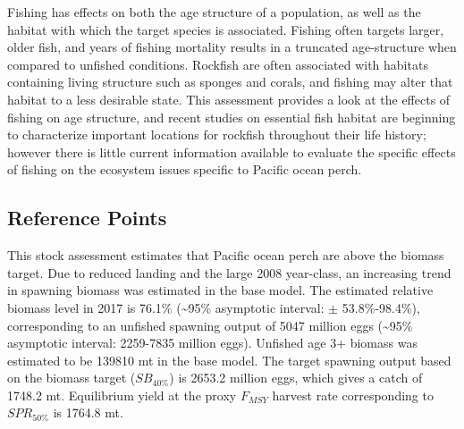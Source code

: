 \documentclass[12pt,]{article}
\begin{document}
Fishing has effects on both the age structure of a population, as well
as the habitat with which the target species is associated. Fishing
often targets larger, older fish, and years of fishing mortality results
in a truncated age-structure when compared to unfished conditions.
Rockfish are often associated with habitats containing living structure
such as sponges and corals, and fishing may alter that habitat to a less
desirable state. This assessment provides a look at the effects of
fishing on age structure, and recent studies on essential fish habitat
are beginning to characterize important locations for rockfish
throughout their life history; however there is little current
information available to evaluate the specific effects of fishing on the
ecosystem issues specific to Pacific ocean perch.

\subsection*{Reference Points}\label{reference-points}

This stock assessment estimates that Pacific ocean perch are above the
biomass target. Due to reduced landing and the large 2008 year-class, an
increasing trend in spawning biomass was estimated in the base model.
The estimated relative biomass level in 2017 is 76.1\%
(\textasciitilde{}95\% asymptotic interval: \(\pm\) 53.8\%-98.4\%),
corresponding to an unfished spawning output of 5047 million eggs
(\textasciitilde{}95\% asymptotic interval: 2259-7835 million eggs).
Unfished age 3+ biomass was estimated to be 139810 mt in the base model.
The target spawning output based on the biomass target (\(SB_{40\%}\))
is 2653.2 million eggs, which gives a catch of 1748.2 mt. Equilibrium
yield at the proxy \(F_{MSY}\) harvest rate corresponding to
\(SPR_{50\%}\) is 1764.8 mt.
\end{document}
